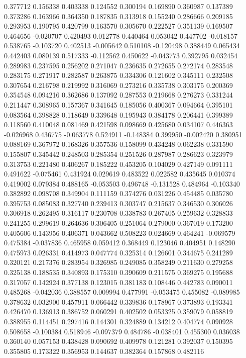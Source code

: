0.377712
0.156338
0.403338
0.124552
0.300194
0.169890
0.360987
0.137389
0.373286
0.163966
0.364350
0.187835
0.313918
0.155240
0.286666
0.209185
0.293953
0.190795
0.420799
0.163570
0.305670
0.222527
0.351139
0.169507
0.464656
-0.020707
0.420493
0.012778
0.440464
0.053042
0.447702
-0.018157
0.538765
-0.103720
0.402513
-0.005642
0.510108
-0.120498
0.388449
0.065434
0.442403
0.080139
0.517333
-0.112562
0.450622
-0.043773
0.392795
0.032454
0.289983
0.237595
0.256202
0.271047
0.236635
0.272655
0.272174
0.283548
0.283175
0.271917
0.282587
0.263875
0.334306
0.121602
0.345111
0.232508
0.307654
0.216798
0.219992
0.316069
0.273216
0.335738
0.303175
0.200369
0.354548
0.094216
0.362686
0.137092
0.287553
0.219668
0.276273
0.331244
0.211447
0.308965
0.157367
0.341645
0.185056
0.400367
0.094664
0.395101
0.083564
0.398828
0.118649
0.339648
0.195943
0.384178
0.206441
0.399389
0.118560
0.410048
0.081469
0.421598
0.098669
0.425680
0.034107
0.446363
-0.026968
0.436775
-0.063778
0.524911
-0.148384
0.399950
-0.002420
0.380951
0.088169
0.367972
0.168326
0.357536
0.158099
0.434248
0.062238
0.331590
0.155807
0.345442
0.248503
0.285354
0.251526
0.287987
0.286623
0.323979
0.313753
0.221480
0.406267
0.185222
0.453205
0.104029
0.427149
0.091111
0.491622
-0.075461
0.431924
0.029619
0.483522
0.022582
0.435645
0.010374
0.419002
0.079384
0.488165
-0.053503
0.496748
-0.131528
0.484964
-0.103340
0.382892
0.098708
0.349904
0.111159
0.374276
0.031226
0.454485
0.035780
0.395753
0.085083
0.327740
0.239413
0.303747
0.215637
0.346530
0.306026
0.306918
0.262495
0.316117
0.230708
0.338783
0.267405
0.259632
0.328833
0.241255
0.299619
0.264636
0.306405
0.251064
0.279000
0.367019
0.173200
0.405606
0.143956
0.406371
0.043662
0.508223
0.024669
0.464241
-0.069579
0.475384
-0.037836
0.465958
0.059412
0.368449
0.123046
0.404951
0.148290
0.475973
0.026331
0.414973
0.047774
0.325314
0.126601
0.344675
0.241289
0.320121
0.217376
0.283954
0.326985
0.249085
0.358249
0.211630
0.279258
0.325138
0.188535
0.340893
0.175310
0.390609
0.211575
0.369275
0.195688
0.317057
0.142924
0.377138
0.123015
0.381183
0.108446
0.442783
0.090011
0.485268
-0.042036
0.388557
0.009994
0.477991
-0.053475
0.455082
-0.089985
0.378632
0.032900
0.457911
0.066442
0.339836
0.178967
0.373893
0.193341
0.426470
0.136913
0.386752
0.060291
0.402502
0.053325
0.359079
0.058819
0.388955
0.114451
0.297416
0.144301
0.324889
0.134212
0.404774
0.090928
0.508658
-0.100384
0.518946
-0.097379
0.484786
-0.038401
0.455300
0.036038
0.360140
0.057153
0.438428
0.090692
0.409978
0.121281
0.392037
0.150395
0.355805
0.173322
0.356953
0.144637
0.382364
0.157868
0.482116
